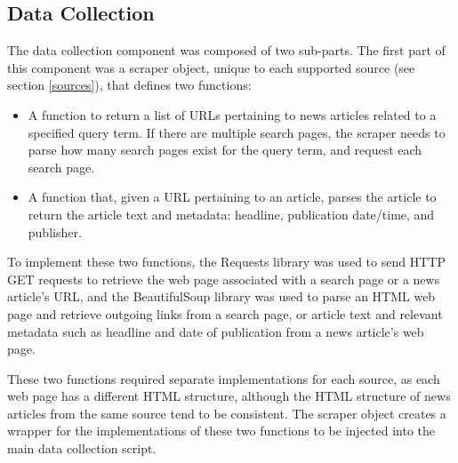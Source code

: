 \documentclass{report}
\begin{document}
\subsection{Data Collection} \label{des-data-collection}

The data collection component was composed of two sub-parts.
The first part of this component was a scraper object, unique to each supported source (see section \ref{sources}), that defines two functions:
\begin{itemize}
	\item A function to return a list of URLs pertaining to news articles related to a specified query term.
		If there are multiple search pages, the scraper needs to parse how many search pages exist for the query term, and request each search page.
	\item A function that, given a URL pertaining to an article, parses the article to return the article text and metadata: headline, publication date/time, and publisher.
\end{itemize}

To implement these two functions, the Requests library \cite{Requests} was used to send HTTP GET requests to retrieve the web page associated with a search page or a news article's URL, and the BeautifulSoup library \cite{BeautifulSoup} was used to parse an HTML web page and retrieve outgoing links from a search page, or article text and relevant metadata such as headline and date of publication from a news article's web page.

These two functions required separate implementations for each source, as each web page has a different HTML structure, although the HTML structure of news articles from the same source tend to be consistent.
The scraper object creates a wrapper for the implementations of these two functions to be injected into the main data collection script.
\end{document}
